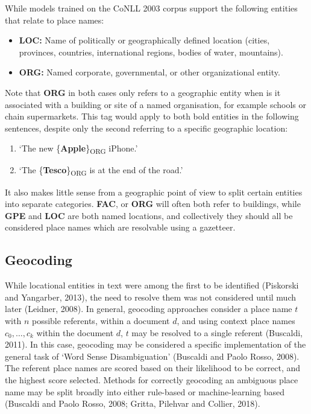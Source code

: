 \documentclass[
  letterpaper,
  11pt,
  english,
  onehalfspacing,
  headsepline]{MastersDoctoralThesis}
\providecommand{\tightlist}{%
  \setlength{\itemsep}{0pt}\setlength{\parskip}{0pt}}\usepackage{longtable,booktabs,array}
\begin{document}
While models trained on the CoNLL 2003 corpus support the following
entities that relate to place names:

\begin{itemize}
\tightlist
\item
  \textbf{LOC:} Name of politically or geographically defined location
  (cities, provinces, countries, international regions, bodies of water,
  mountains).
\item
  \textbf{ORG:} Named corporate, governmental, or other organizational
  entity.
\end{itemize}

Note that \textbf{ORG} in both cases only refers to a geographic entity
when is it associated with a building or site of a named organisation,
for example schools or chain supermarkets. This tag would apply to both
bold entities in the following sentences, despite only the second
referring to a specific geographic location:

\begin{enumerate}
\def\labelenumi{\alph{enumi}.}
\item
  `The new \{\textbf{Apple}\}\textsubscript{ORG} iPhone.'
\item
  `The \{\textbf{Tesco}\}\textsubscript{ORG} is at the end of the road.'
\end{enumerate}

It also makes little sense from a geographic point of view to split
certain entities into separate categories. \textbf{FAC}, or \textbf{ORG}
will often both refer to buildings, while \textbf{GPE} and \textbf{LOC}
are both named locations, and collectively they should all be considered
place names which are resolvable using a gazetteer.

\hypertarget{geocoding}{%
\subsection{Geocoding}\label{geocoding}}

While locational entities in text were among the first to be identified
(Piskorski and Yangarber, 2013), the need to resolve them was not
considered until much later (Leidner, 2008). In general, geocoding
approaches consider a place name \(t\) with \(n\) possible referents,
within a document \(d\), and using context place names
\(c_0,\dots, c_k\) within the document \(d\), \(t\) may be resolved to a
single referent (Buscaldi, 2011). In this case, geocoding may be
considered a specific implementation of the general task of `Word Sense
Disambiguation' (Buscaldi and Paolo Rosso, 2008). The referent place
names are scored based on their likelihood to be correct, and the
highest score selected. Methods for correctly geocoding an ambiguous
place name may be split broadly into either rule-based or
machine-learning based (Buscaldi and Paolo Rosso, 2008; Gritta, Pilehvar
and Collier, 2018).
\end{document}
